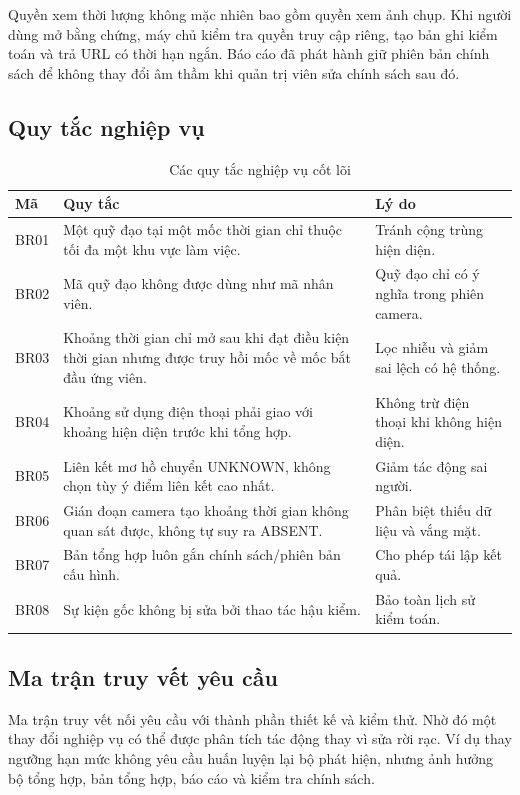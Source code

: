 Quyền xem thời lượng không mặc nhiên bao gồm quyền xem ảnh chụp. Khi người dùng mở bằng chứng, máy chủ kiểm tra quyền truy cập riêng, tạo bản ghi kiểm toán và trả URL có thời hạn ngắn. Báo cáo đã phát hành giữ phiên bản chính sách để không thay đổi âm thầm khi quản trị viên sửa chính sách sau đó.

\subsection{Quy tắc nghiệp vụ}
\begin{table}[H]
\centering
\caption{Các quy tắc nghiệp vụ cốt lõi}
\label{tab:business-rules}
\begin{tabularx}{\textwidth}{p{2cm}X X}
\toprule
\textbf{Mã} & \textbf{Quy tắc} & \textbf{Lý do}\\
\midrule
BR01 & Một quỹ đạo tại một mốc thời gian chỉ thuộc tối đa một khu vực làm việc. & Tránh cộng trùng hiện diện.\\
BR02 & Mã quỹ đạo không được dùng như mã nhân viên. & Quỹ đạo chỉ có ý nghĩa trong phiên camera.\\
BR03 & Khoảng thời gian chỉ mở sau khi đạt điều kiện thời gian nhưng được truy hồi mốc về mốc bắt đầu ứng viên. & Lọc nhiễu và giảm sai lệch có hệ thống.\\
BR04 & Khoảng sử dụng điện thoại phải giao với khoảng hiện diện trước khi tổng hợp. & Không trừ điện thoại khi không hiện diện.\\
BR05 & Liên kết mơ hồ chuyển UNKNOWN, không chọn tùy ý điểm liên kết cao nhất. & Giảm tác động sai người.\\
BR06 & Gián đoạn camera tạo khoảng thời gian không quan sát được, không tự suy ra ABSENT. & Phân biệt thiếu dữ liệu và vắng mặt.\\
BR07 & Bản tổng hợp luôn gắn chính sách/phiên bản cấu hình. & Cho phép tái lập kết quả.\\
BR08 & Sự kiện gốc không bị sửa bởi thao tác hậu kiểm. & Bảo toàn lịch sử kiểm toán.\\
\bottomrule
\end{tabularx}
\end{table}

\subsection{Ma trận truy vết yêu cầu}
Ma trận truy vết nối yêu cầu với thành phần thiết kế và kiểm thử. Nhờ đó một thay đổi nghiệp vụ có thể được phân tích tác động thay vì sửa rời rạc. Ví dụ thay ngưỡng hạn mức không yêu cầu huấn luyện lại bộ phát hiện, nhưng ảnh hưởng bộ tổng hợp, bản tổng hợp, báo cáo và kiểm tra chính sách.

